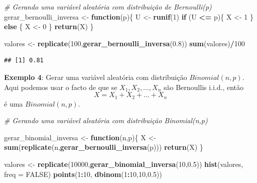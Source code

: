 \documentclass[
]{book}
\newenvironment{Shaded}{\begin{snugshade}}{\end{snugshade}}
\newcommand{\AttributeTok}[1]{\textcolor[rgb]{0.13,0.29,0.53}{#1}}
\newcommand{\CommentTok}[1]{\textcolor[rgb]{0.56,0.35,0.01}{\textit{#1}}}
\newcommand{\ConstantTok}[1]{\textcolor[rgb]{0.56,0.35,0.01}{#1}}
\newcommand{\ControlFlowTok}[1]{\textcolor[rgb]{0.13,0.29,0.53}{\textbf{#1}}}
\newcommand{\DecValTok}[1]{\textcolor[rgb]{0.00,0.00,0.81}{#1}}
\newcommand{\FloatTok}[1]{\textcolor[rgb]{0.00,0.00,0.81}{#1}}
\newcommand{\FunctionTok}[1]{\textcolor[rgb]{0.13,0.29,0.53}{\textbf{#1}}}
\newcommand{\NormalTok}[1]{#1}
\newcommand{\OtherTok}[1]{\textcolor[rgb]{0.56,0.35,0.01}{#1}}
\newcommand{\SpecialCharTok}[1]{\textcolor[rgb]{0.81,0.36,0.00}{\textbf{#1}}}
\begin{document}
\begin{Shaded}
\begin{Highlighting}[]
\CommentTok{\# Gerando uma variável aleatória com distribuição de Bernoulli(p)}
\NormalTok{gerar\_bernoulli\_inversa }\OtherTok{\textless{}{-}} \ControlFlowTok{function}\NormalTok{(p)\{}
\NormalTok{  U }\OtherTok{\textless{}{-}} \FunctionTok{runif}\NormalTok{(}\DecValTok{1}\NormalTok{)}
  \ControlFlowTok{if}\NormalTok{ (U }\SpecialCharTok{\textless{}=}\NormalTok{ p)\{}
\NormalTok{    X }\OtherTok{\textless{}{-}} \DecValTok{1}
\NormalTok{  \} }\ControlFlowTok{else}\NormalTok{ \{}
\NormalTok{    X }\OtherTok{\textless{}{-}} \DecValTok{0}
\NormalTok{  \}}
  \FunctionTok{return}\NormalTok{(X)}
\NormalTok{\}}

\NormalTok{valores }\OtherTok{\textless{}{-}} \FunctionTok{replicate}\NormalTok{(}\DecValTok{100}\NormalTok{,}\FunctionTok{gerar\_bernoulli\_inversa}\NormalTok{(}\FloatTok{0.8}\NormalTok{))}
\FunctionTok{sum}\NormalTok{(valores)}\SpecialCharTok{/}\DecValTok{100}
\end{Highlighting}
\end{Shaded}

\begin{verbatim}
## [1] 0.81
\end{verbatim}

\textbf{Exemplo 4}: Gerar uma variável aleatória com distribuição
\(Binomial(n,p)\). Aqui podemos usar o facto de que se
\(X_{1},X_{2},\ldots,X_{n}\) são Bernoullis i.i.d., então
\[X = X_{1}+X_{2}+\ldots+X_{n}\] é uma \(Binomial(n,p)\).

\begin{Shaded}
\begin{Highlighting}[]
\CommentTok{\# Gerando uma variável aleatória com distribuição Binomial(n,p)}

\NormalTok{gerar\_binomial\_inversa }\OtherTok{\textless{}{-}} \ControlFlowTok{function}\NormalTok{(n,p)\{}
\NormalTok{  X }\OtherTok{\textless{}{-}} \FunctionTok{sum}\NormalTok{(}\FunctionTok{replicate}\NormalTok{(n,}\FunctionTok{gerar\_bernoulli\_inversa}\NormalTok{(p)))}
  \FunctionTok{return}\NormalTok{(X)}
\NormalTok{\}}

\NormalTok{valores }\OtherTok{\textless{}{-}} \FunctionTok{replicate}\NormalTok{(}\DecValTok{10000}\NormalTok{,}\FunctionTok{gerar\_binomial\_inversa}\NormalTok{(}\DecValTok{10}\NormalTok{,}\FloatTok{0.5}\NormalTok{))}
\FunctionTok{hist}\NormalTok{(valores, }\AttributeTok{freq =} \ConstantTok{FALSE}\NormalTok{)}
\FunctionTok{points}\NormalTok{(}\DecValTok{1}\SpecialCharTok{:}\DecValTok{10}\NormalTok{, }\FunctionTok{dbinom}\NormalTok{(}\DecValTok{1}\SpecialCharTok{:}\DecValTok{10}\NormalTok{,}\DecValTok{10}\NormalTok{,}\FloatTok{0.5}\NormalTok{))}
\end{Highlighting}
\end{Shaded}
\end{document}
